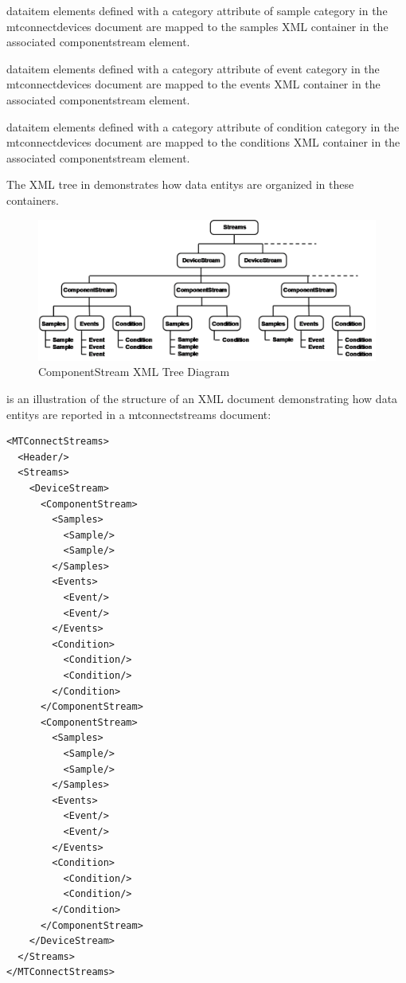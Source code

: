 \documentclass{mtconnect}	%
\begin{document}
\tab \gls{dataitem} elements defined with a \gls{category} attribute of \gls{sample category} in the \gls{mtconnectdevices} document are mapped to the \gls{samples} XML container in the associated \gls{componentstream} element.

\tab \gls{dataitem} elements defined with a \gls{category} attribute of \gls{event category} in the \gls{mtconnectdevices} document are mapped to the \gls{events} XML container in the associated \gls{componentstream} element.

\tab \gls{dataitem} elements defined with a \gls{category} attribute of \gls{condition category} in the \gls{mtconnectdevices} document are mapped to the \gls{conditions} XML container in the associated \gls{componentstream} element.

The XML tree in  demonstrates how \glspl{data entity} are organized in these containers.  

\begin{figure}[ht]
  \centering
  \includegraphics[width=1.0\textwidth]{figures/componentstream-xml-tree-diagram.png}
  \caption{ComponentStream XML Tree Diagram}
  \label{fig:componentstream-xml-tree-diagram}
\end{figure}
\FloatBarrier

 is an illustration of the structure of an XML document demonstrating how \glspl{data entity} are reported in a \gls{mtconnectstreams} document:

\begin{lstlisting}[firstnumber=1,escapechar=|,%
    caption={Example of  MTConnectStreams},label={lst:example-of-mtconnectstreams}]
<MTConnectStreams>
  <Header/>
  <Streams>
    <DeviceStream>
      <ComponentStream>
        <Samples>
          <Sample/>
          <Sample/>
        </Samples>
        <Events>
          <Event/>
          <Event/>
        </Events>
        <Condition>
          <Condition/>
          <Condition/>
        </Condition>
      </ComponentStream>
      <ComponentStream>
        <Samples>
          <Sample/>
          <Sample/>
        </Samples>
        <Events>
          <Event/>
          <Event/>
        </Events>
        <Condition>
          <Condition/>
          <Condition/>
        </Condition>
      </ComponentStream>
    </DeviceStream>
  </Streams>
</MTConnectStreams>
\end{lstlisting}
\end{document}
